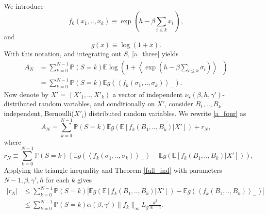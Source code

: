 \documentclass[a4paper,12pt,oneside,reqno]{amsart}
\numberwithin{equation}{section}
\begin{document}
We introduce 
\begin{equation} \label{ffunc}
f_k(x_1,..,x_k) {\equiv} \exp\left( h- {\beta} \sum_{i\leq k} x_i \right)\,,
\end{equation}
and 
\begin{equation} \label{gfunc}
g(x){\equiv} \log\left(1+x\right).
\end{equation}
With this notation, and integrating out $S$, \eqref{a_three} yields
\begin{equation} \begin{aligned} \label{a_four}
A_N & = \sum\limits_{k=0}^{N-1}{\mathbb{P}}(S=k){{\mathbb{E}}} \log\left(1 + \left< \exp\left( h- {\beta} \sum_{i\leq k} {\sigma}_i \right)\right>_- \right) \\
& =  \sum\limits_{k=0}^{N-1}{\mathbb{P}}(S=k){{\mathbb{E}}} g\left( \left<f_k({\sigma}_1,..,{\sigma}_k)\right>_{-}\right).
\end{aligned} \end{equation}
Now denote by $X'=\left(X'_1,..,X'_k\right)$ a vector of independent $\nu_\star({\beta},h,\gamma')$-distributed random variables, and conditionally on $X'$,  consider $B_1,..,B_k$  independent, Bernoulli($X'_i$) distributed random variables. We rewrite \eqref{a_four} as 
\begin{equation} \label{a_five}
A_N = \sum\limits_{k=0}^{N-1}{\mathbb{P}}(S=k){{\mathbb{E}}} g\left({{\mathbb{E}}}\left[ f_k(B_1,..,B_k)|X'\right] \right)+r_N,
\end{equation}
where
\begin{equation}
r_N {\equiv} \sum\limits_{k=0}^{N-1}{\mathbb{P}}(S=k) \left({{\mathbb{E}}} g\left( \left<f_k({\sigma}_1,..,{\sigma}_k)\right>_{-}\right)- {{\mathbb{E}}} g\left({{\mathbb{E}}}\left[ f_k(B_1,..,B_k)|X'\right] \right) \right),
\end{equation}
Applying the triangle inequality and Theorem \ref{full_ind} with parameters $N-1,{\beta},\gamma',h$ for each $k$ gives
\begin{equation} \begin{aligned} \label{a_seven}
\left|r_N\right| & \leq \sum\limits_{k=0}^{N-1}{\mathbb{P}}(S=k)\left| {{\mathbb{E}}} g\left({{\mathbb{E}}}\left[ f_k(B_1,..,B_k)|X'\right] \right)-{{\mathbb{E}}} g\left(\left< f_k(B_1,..,B_k)\right>_-  \right)\right| \\
& \leq \sum\limits_{k=0}^{N-1}{\mathbb{P}}(S=k) \alpha(\beta,\gamma') \|f_k\|_\infty L_g \frac{k^3}{N-1}.
\end{aligned} \end{equation}
\end{document}
